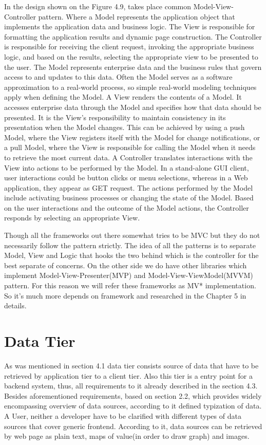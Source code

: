     In the design shown on the Figure 4.9, takes place common Model-View-Controller pattern. Where a Model represents the application object that implements the application data and business logic. The View is responsible for formatting the application results and dynamic page construction. The Controller is responsible for receiving the client request, invoking the appropriate business logic, and based on the results, selecting the appropriate view to be presented to the user. The Model represents enterprise data and the business rules that govern access to and updates to this data. Often the Model serves as a software approximation to a real-world process, so simple real-world modeling techniques apply when defining the Model. A View renders the contents of a Model. It accesses enterprise data through the Model and specifies how that data should be presented. It is the View's responsibility to maintain consistency in its presentation when the Model changes. This can be achieved by using a push Model, where the View registers itself with the Model for change notifications, or a pull Model, where the View is responsible for calling the Model when it needs to retrieve the most current data. A Controller translates interactions with the View into actions to be performed by the Model. In a stand-alone GUI client, user interactions could be button clicks or menu selections, whereas in a Web application, they appear as GET request. The actions performed by the Model include activating business processes or changing the state of the Model. Based on the user interactions and the outcome of the Model actions, the Controller responds by selecting an appropriate View. 

  Though all the frameworks out there somewhat tries to be MVC but they do not necessarily follow the pattern strictly. The idea of all the patterns is to separate Model, View and Logic that hooks the two behind which is the controller for the best separate of concerns. On the other side we do have other libraries which implement Model-View-Presenter(MVP) and Model-View-ViewModel(MVVM) pattern. For this reason we will refer these frameworks as MV* implementation. So it's much more depends on framework and researched in the Chapter 5 in details.
      

\section{Data Tier}
   As was mentioned in section 4.1 data tier consists source of data that have to be retrieved by application tier to a client tier. Also this tier is a entry point for a backend system, thus, all requirements to it already described in the section 4.3. Besides aforementioned requirements, based on section 2.2, which provides widely encompassing overview of data sources, according to it defined typization of data. A User, neither a developer have to be clarified with different types of data sources that cover generic frontend. According to it, data sources can be retrieved by web page as plain text, maps of value(in order to draw graph) and images.


